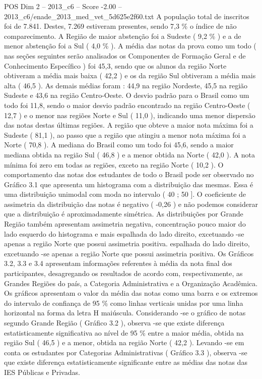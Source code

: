 \begin{textsample}{POS Dim 2 – 2013\_c6 – Score -2.00 – 2013\_c6/enade\_2013\_med\_vet\_5d625e2f60.txt}
A população total de inscritos foi de 7.841.
Destes, 7.269 estiveram presentes, sendo 7,3 \% o índice de não comparecimento.
A Região de maior abstenção foi a Sudeste ( 9,2 \% ) e a de menor abstenção foi a Sul ( 4,0 \% ).
A média das notas da prova como um todo ( nas seções seguintes serão analisados os Componentes de Formação Geral e de Conhecimento Específico ) foi 45,3, sendo que os alunos da região Norte obtiveram a média mais baixa ( 42,2 ) e os da região Sul obtiveram a média mais alta ( 46,5 ).
As demais médias foram : 44,9 na região Nordeste, 45,5 na região Sudeste e 43,6 na região Centro-Oeste.
O desvio padrão para o Brasil como um todo foi 11,8, sendo o maior desvio padrão encontrado na região Centro-Oeste ( 12,7 ) e o menor nas regiões Norte e Sul ( 11,0 ), indicando uma menor dispersão das notas destas últimas regiões.
A região que obteve a maior nota máxima foi a Sudeste ( 81,1 ), ao passo que a região que atingiu a menor nota máxima foi a Norte ( 70,8 ).
A mediana do Brasil como um todo foi 45,6, sendo a maior mediana obtida na região Sul ( 46,8 ) e a menor obtida na Norte ( 42,0 ).
A nota mínima foi zero em todas as regiões, exceto na região Norte ( 10,2 ).
O comportamento das notas dos estudantes de todo o Brasil pode ser observado no Gráfico 3.1 que apresenta um histograma com a distribuição das mesmas.
Essa é uma distribuição unimodal com moda no intervalo ( 40 ; 50 ].
O coeficiente de assimetria da distribuição das notas é negativo ( -0,26 ) e não podemos considerar que a distribuição é aproximadamente simétrica.
As distribuições por Grande Região também apresentam assimetria negativa, concentração pouco maior do lado esquerdo do histograma e mais espalhada do lado direito, excetuando -se apenas a região Norte que possui assimetria positiva. espalhada do lado direito, excetuando -se apenas a região Norte que possui assimetria positiva.
Os Gráficos 3.2, 3.3 e 3.4 apresentam informações referentes à média da nota final dos participantes, desagregando os resultados de acordo com, respectivamente, as Grandes Regiões do país, a Categoria Administrativa e a Organização Acadêmica.
Os gráficos apresentam o valor da média das notas como uma barra e os extremos do intervalo de confiança de 95 \% como linhas verticais unidas por uma linha horizontal na forma da letra H maiúscula.
Considerando -se o gráfico de notas segundo Grande Região ( Gráfico 3.2 ), observa -se que existe diferença estatisticamente significativa ao nível de 95 \% entre a maior média, obtida na região Sul ( 46,5 ) e a menor, obtida na região Norte ( 42,2 ).
Levando -se em conta os estudantes por Categorias Administrativas ( Gráfico 3.3 ), observa -se que existe diferença estatisticamente significante entre as médias das notas das IES Públicas e Privadas.

\end{textsample}
